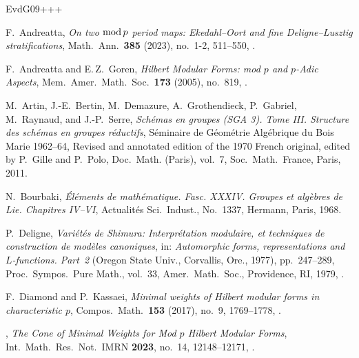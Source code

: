 \documentclass[11pt]{amsart}
\numberwithin{equation}{section}
\theoremstyle{definition}
\theoremstyle{remark}
\begin{document}
\begin{thebibliography}{EvdG09+++}

F.~Andreatta, \emph{On two {${\rm mod}\,p$} period maps: {E}kedahl--{O}ort and
  fine {D}eligne--{L}usztig stratifications}, Math.\ Ann.\ \textbf{385} (2023),
no.~1-2, 511--550, .

F.~Andreatta and E.\,Z.~Goren, \emph{Hilbert Modular Forms: mod $p$ and $p$-Adic
  Aspects}, Mem.\ Amer.\ Math.\ Soc.\ \textbf{173} (2005), no.~819, 
.

  
M.~Artin, J.-E.~Bertin, M.~Demazure, A.~Grothendieck, P.~Gabriel, M.~Raynaud, and J.-P.~Serre,  \emph{Sch\'emas en groupes (SGA 3). Tome III. Structure des sch\'emas en groupes r\'eductifs}, S\'eminaire de G\'eom\'etrie Alg\'ebrique du Bois Marie 1962--64, Revised and annotated edition of the 1970 French original, edited by P.~Gille and P.~Polo, Doc.\ Math. (Paris), vol.~7, Soc.\ Math.\ France,
Paris, 2011.

  N.~Bourbaki, \emph{\'El\'ements de math\'ematique. Fasc. XXXIV. Groupes et alg\`ebres de Lie. Chapitres IV--VI}, Actualit\'es Sci.\ Indust., No.~1337, Hermann, Paris, 1968. 


P.~Deligne, \emph{Vari\'et\'es de {S}himura: {I}nterpr\'etation modulaire, et
  techniques de construction de mod\`eles canoniques}, in: \emph{Automorphic forms,  representations and {$L$}-functions. Part~2} ({O}regon {S}tate {U}niv., {C}orvallis, Ore., 1977), pp.~247--289, {P}roc.\ {S}ympos.\ {P}ure {M}ath., vol.~33, Amer.\ Math.\ Soc., Providence, RI,
  1979, .

F.~Diamond and P.~Kassaei, \emph{Minimal weights of {H}ilbert modular forms in
  characteristic {$p$}}, Compos.\ Math.\ \textbf{153} (2017), no.~9, 1769--1778,
.

\bysame, \emph{The {C}one of {M}inimal {W}eights for {M}od $p$ {H}ilbert
  {M}odular {F}orms}, Int.\ Math.\ Res.\ Not.\ IMRN \textbf{2023}, no.~14, 12148--12171, 
.


\end{thebibliography}
\end{document}
